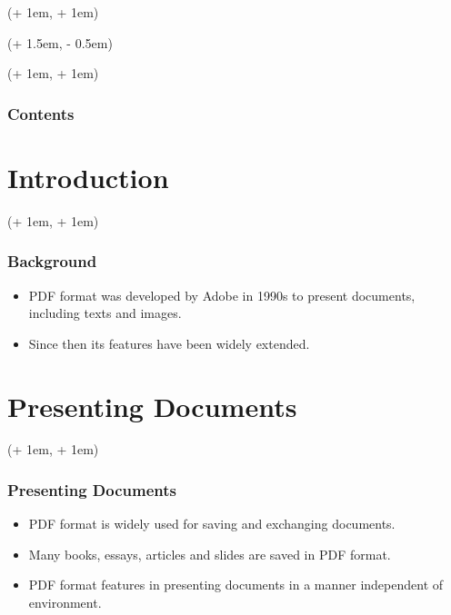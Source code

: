 \documentclass[xcolor=dvipsnames]{beamer}
\title{\TITLE}
\author{\AUTHOR}
\date{\tdyear\dateseparator\tdmonth\dateseparator\tdday\hspace{1em}\tdtime}
\institute{\INSTITUTE}
\newcommand{\FrameTextCrono}[1]{
    \begin{textblock*}{\paperwidth}(\textwidth + 1em, \textheight + 1em)
        #1
    \end{textblock*}
}
\newcommand{\FrameTextResetCrono}[1]{
    \begin{textblock*}{\paperwidth}(\textwidth + 1.5em, \textheight - 0.5em)
        #1
    \end{textblock*}
}
\newcommand{\ResetCronoBox}{\resetcrono{\fbox{reset}}}
\let\oldframe\frame
\let\oldendframe\endframe
\renewenvironment{frame}
    {\oldframe\FrameTextCrono{\small\color{blue}{\crono}}}
    {\oldendframe}
\let\oldtitlepage\titlepage
\renewcommand{\titlepage}{\oldtitlepage\FrameTextResetCrono{\ResetCronoBox}}
\begin{document}

    \begin{frame}
        \initclock
        \titlepage
    \end{frame}


    \begin{frame}
        \frametitle{Contents}
        \tableofcontents
    \end{frame}


    \section{Introduction}

    \begin{frame}
        \frametitle{Background}
        \begin{itemize}
            \item PDF format was developed by Adobe in 1990s
                to present documents, including texts and images.
            \item Since then its features have been widely extended.
        \end{itemize}
    \end{frame}

    \section{Presenting Documents}

    \begin{frame}
        \frametitle{Presenting Documents}
        \begin{itemize}
            \item PDF format is widely used for saving and exchanging documents.
            \item Many books, essays, articles and slides are saved
                in PDF format.
            \item PDF format features in presenting documents
                in a manner independent of environment.
        \end{itemize}
    \end{frame}
\end{document}
